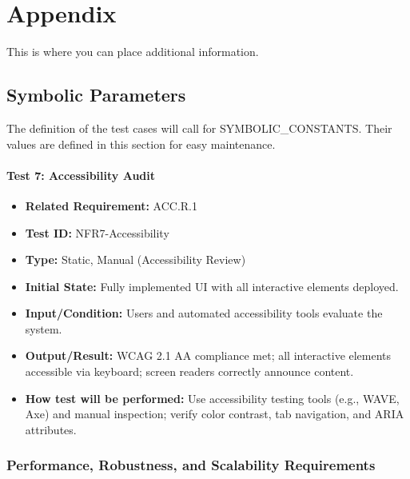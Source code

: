\documentclass[12pt, titlepage]{article}
\begin{document}
% 
% 

\newpage

\section{Appendix}

This is where you can place additional information.

\subsection{Symbolic Parameters}

The definition of the test cases will call for SYMBOLIC\_CONSTANTS.
Their values are defined in this section for easy maintenance.

\paragraph{Test 7: Accessibility Audit}
\begin{itemize}
    \item \textbf{Related Requirement:} ACC.R.1
    \item \textbf{Test ID:} NFR7-Accessibility
    \item \textbf{Type:} Static, Manual (Accessibility Review)
    \item \textbf{Initial State:} Fully implemented UI with all interactive elements deployed.
    \item \textbf{Input/Condition:} Users and automated accessibility tools evaluate the system.
    \item \textbf{Output/Result:} WCAG 2.1 AA compliance met; all interactive elements accessible via keyboard; screen readers correctly announce content.
    \item \textbf{How test will be performed:} Use accessibility testing tools (e.g., WAVE, Axe) and manual inspection; verify color contrast, tab navigation, and ARIA attributes.
\end{itemize}

\subsubsection{Performance, Robustness, and Scalability Requirements}
\end{document}
